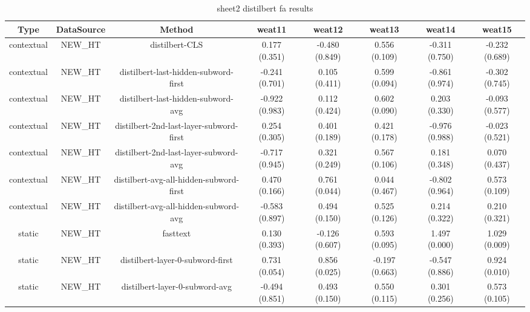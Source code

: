 \begin{sidewaystable}[htb]
    \centering
    \caption{sheet2 distilbert fa results}
    \label{appendix_tab:sheet2_distilbert_fa_results}
    \small
    \begin{tabular}{@{}cccccccc@{}}
        \toprule
        Type & DataSource & Method & weat11 & weat12 & weat13 & weat14 & weat15 \\
        \midrule
        contextual & NEW\_HT & distilbert-CLS & 0.177 (0.351) & -0.480 (0.849) & 0.556 (0.109) & -0.311 (0.750) & -0.232 (0.689) \\
        contextual & NEW\_HT & distilbert-last-hidden-subword-first & -0.241 (0.701) & 0.105 (0.411) & 0.599 (0.094) & -0.861 (0.974) & -0.302 (0.745) \\
        contextual & NEW\_HT & distilbert-last-hidden-subword-avg & -0.922 (0.983) & 0.112 (0.424) & 0.602 (0.090) & 0.203 (0.330) & -0.093 (0.577) \\
        contextual & NEW\_HT & distilbert-2nd-last-layer-subword-first & 0.254 (0.305) & 0.401 (0.189) & 0.421 (0.178) & -0.976 (0.988) & -0.023 (0.521) \\
        contextual & NEW\_HT & distilbert-2nd-last-layer-subword-avg & -0.717 (0.945) & 0.321 (0.249) & 0.567 (0.106) & 0.181 (0.348) & 0.070 (0.437) \\
        contextual & NEW\_HT & distilbert-avg-all-hidden-subword-first & 0.470 (0.166) & 0.761 (0.044) & 0.044 (0.467) & -0.802 (0.964) & 0.573 (0.109) \\
        contextual & NEW\_HT & distilbert-avg-all-hidden-subword-avg & -0.583 (0.897) & 0.494 (0.150) & 0.525 (0.126) & 0.214 (0.322) & 0.210 (0.321) \\
        static & NEW\_HT & fasttext & 0.130 (0.393) & -0.126 (0.607) & 0.593 (0.095) & 1.497 (0.000) & 1.029 (0.009) \\
        static & NEW\_HT & distilbert-layer-0-subword-first & 0.731 (0.054) & 0.856 (0.025) & -0.197 (0.663) & -0.547 (0.886) & 0.924 (0.010) \\
        static & NEW\_HT & distilbert-layer-0-subword-avg & -0.494 (0.851) & 0.493 (0.150) & 0.550 (0.115) & 0.301 (0.256) & 0.573 (0.105) \\
        \bottomrule
    \end{tabular}
\end{sidewaystable}